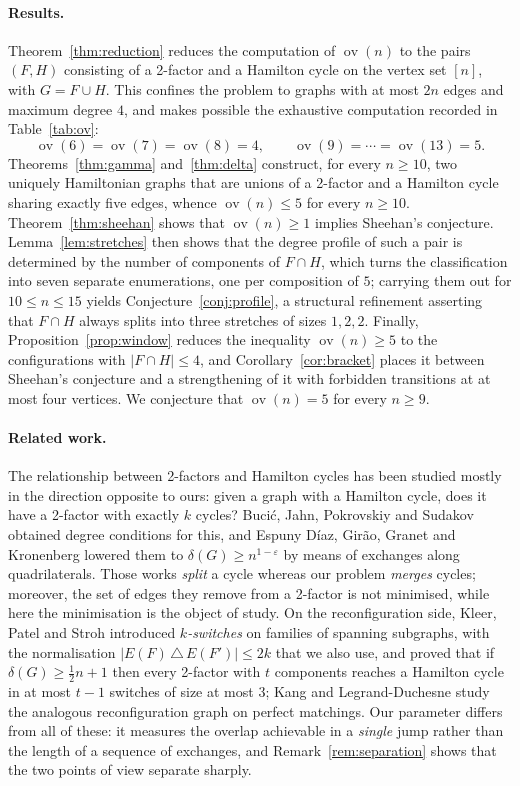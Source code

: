 \documentclass[11pt,a4paper]{article}
\theoremstyle{definition}
\theoremstyle{remark}
\newcommand{\ov}{\operatorname{ov}}
\begin{document}
\paragraph{Results.} Theorem~\ref{thm:reduction} reduces the computation of $\ov(n)$ to the pairs $(F,H)$ consisting of a 2-factor and a Hamilton cycle on the vertex set $[n]$, with $G=F\cup H$. This confines the problem to graphs with at most $2n$ edges and maximum degree $4$, and makes possible the exhaustive computation recorded in Table~\ref{tab:ov}:
\[
\ov(6)=\ov(7)=\ov(8)=4,\qquad \ov(9)=\cdots=\ov(13)=5 .
\]
Theorems~\ref{thm:gamma} and~\ref{thm:delta} construct, for every $n\ge10$, two uniquely Hamiltonian graphs that are unions of a 2-factor and a Hamilton cycle sharing exactly five edges, whence $\ov(n)\le5$ for every $n\ge10$. Theorem~\ref{thm:sheehan} shows that $\ov(n)\ge1$ implies Sheehan's conjecture. Lemma~\ref{lem:stretches} then shows that the degree profile of such a pair is determined by the number of components of $F\cap H$, which turns the classification into seven separate enumerations, one per composition of $5$; carrying them out for $10\le n\le15$ yields Conjecture~\ref{conj:profile}, a structural refinement asserting that $F\cap H$ always splits into three stretches of sizes $1,2,2$. Finally, Proposition~\ref{prop:window} reduces the inequality $\ov(n)\ge5$ to the configurations with $|F\cap H|\le4$, and Corollary~\ref{cor:bracket} places it between Sheehan's conjecture and a strengthening of it with forbidden transitions at at most four vertices. We conjecture that $\ov(n)=5$ for every $n\ge9$.

\paragraph{Related work.} The relationship between 2-factors and Hamilton cycles has been studied mostly in the direction opposite to ours: given a graph with a Hamilton cycle, does it have a 2-factor with exactly $k$ cycles? Bucić, Jahn, Pokrovskiy and Sudakov \cite{bjps} obtained degree conditions for this, and Espuny Díaz, Girão, Granet and Kronenberg \cite{eggk} lowered them to $\delta(G)\ge n^{1-\varepsilon}$ by means of exchanges along quadrilaterals. Those works \emph{split} a cycle whereas our problem \emph{merges} cycles; moreover, the set of edges they remove from a 2-factor is not minimised, while here the minimisation is the object of study. On the reconfiguration side, Kleer, Patel and Stroh \cite{kps} introduced \emph{$k$-switches} on families of spanning subgraphs, with the normalisation $|E(F)\,\triangle\,E(F')|\le2k$ that we also use, and proved that if $\delta(G)\ge\frac12n+1$ then every 2-factor with $t$ components reaches a Hamilton cycle in at most $t-1$ switches of size at most $3$; Kang and Legrand-Duchesne \cite{kld} study the analogous reconfiguration graph on perfect matchings. Our parameter differs from all of these: it measures the overlap achievable in a \emph{single} jump rather than the length of a sequence of exchanges, and Remark~\ref{rem:separation} shows that the two points of view separate sharply.
\end{document}
